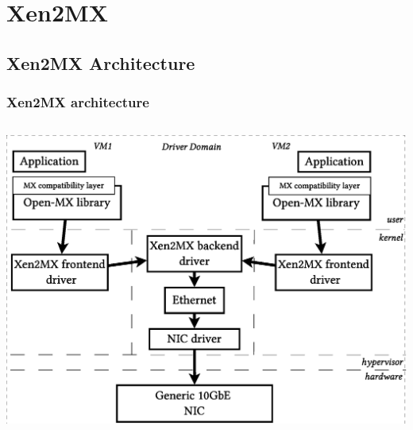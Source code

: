 \documentclass[red,slidestop,notes,compress,mathserif]{beamer}
\begin{document}
\section{Xen2MX}

\subsection{Xen2MX Architecture}

\begin{frame}
\frametitle{Xen2MX architecture}
\begin{columns}
\includegraphics[width=\textwidth]{figs/bare/xen2mx.eps}
\end{columns}
\end{frame}
\end{document}
